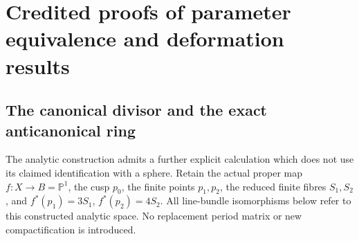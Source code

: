 \appendix
\section{Credited proofs of parameter equivalence and deformation results}
\subsection{The canonical divisor and the exact anticanonical ring}
\label{wb:sec:canonical-ring-recovery}

The analytic construction admits a further explicit calculation which does
not use its claimed identification with a sphere. Retain the actual proper
map $f:X\to B=\mathbb P^1$, the cusp $p_0$, the finite points $p_1,p_2$,
the reduced finite fibres $S_1,S_2$, and
$f^*(p_1)=3S_1$, $f^*(p_2)=4S_2$. All line-bundle isomorphisms below
refer to this constructed analytic space. No replacement period matrix or
new compactification is introduced.

